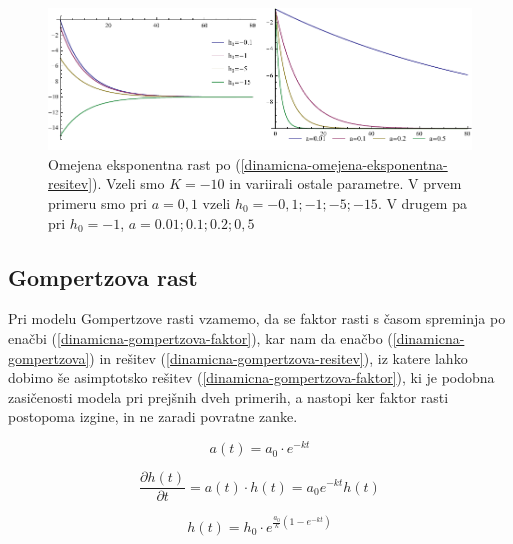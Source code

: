 \documentclass[a4paper, oneside, 12pt]{book}
\begin{document}
            \begin{figure}[H]
              \begin{center}
                \includegraphics[width=14cm]{slike/omejena-eksponentna-rast}
              \end{center}
              \caption{Omejena eksponentna rast po (\ref{dinamicna-omejena-eksponentna-resitev}). Vzeli smo $K=-10$ in variirali ostale parametre. V prvem primeru smo pri $a=0,1$ vzeli $h_0=-0,1;-1;-5;-15$. V drugem pa pri $h_0=-1$, $a=0.01;0.1;0.2;0,5$}
              \label{fig:omejena-eksponentna-rast}
            \end{figure}



          \subsection{Gompertzova rast}

          Pri modelu Gompertzove rasti vzamemo, da se faktor rasti s časom spreminja po enačbi (\ref{dinamicna-gompertzova-faktor}), kar nam da enačbo (\ref{dinamicna-gompertzova}) in rešitev (\ref{dinamicna-gompertzova-resitev}), iz katere lahko dobimo še asimptotsko rešitev (\ref{dinamicna-gompertzova-faktor}), ki je podobna zasičenosti modela pri prejšnih dveh primerih, a nastopi ker faktor rasti postopoma izgine, in ne zaradi povratne zanke.

          \begin{equation}
            a(t) = a_0 \cdot e^{- k t}
            \label{dinamicna-gompertzova-faktor}
          \end{equation}

          \begin{equation}
            \frac{\partial h(t)}{\partial t} = a(t) \cdot h(t) = a_0 e^{ -k t} h(t)
            \label{dinamicna-gompertzova}
          \end{equation}

          \begin{equation}
            h(t) = h_0 \cdot e^{\frac{a_0}{k}(1-e^{-kt})}
           \label{dinamicna-gompertzova-resitev}
          \end{equation}
\end{document}
